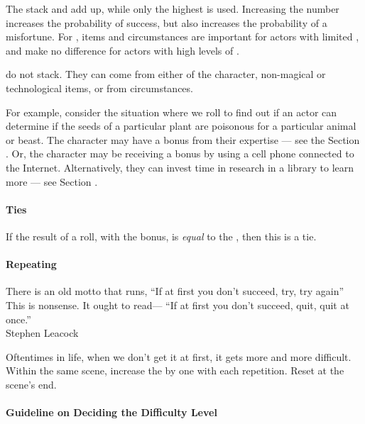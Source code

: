 \begin{emphasisParagraph}
	The  stack and add up, while only the highest  is used.
	Increasing the number  increases the probability of success, but
	also increases the probability of a misfortune. For ,
	items and circumstances are important for actors with limited ,
	and make no difference for actors with high levels of .
\end{emphasisParagraph}


 do not stack.
They can come from either  of the character,
non-magical or technological items, or from circumstances.

For example, consider the situation where we roll to find out if
an actor can determine if the seeds of a particular plant are
poisonous for a particular animal or beast. The character may have a
bonus from their expertise --- see the Section .
Or, the character may be receiving a bonus by using a cell phone connected to the Internet.
Alternatively, they can invest time in research in a library to learn more
--- see Section .




\paragraph*{Ties}
If the result of a roll, with the bonus, is \emph{equal} to the \acronymDL,
then this is a tie.

\paragraph*{Repeating}

\begin{emphasisParagraph}
There is an old motto that runs, ``If at first you don't succeed, try, try again'' This is nonsense. It ought to read— ``If at first you don't succeed, quit, quit at once.''\\
Stephen Leacock
\end{emphasisParagraph}

Oftentimes in life, when we don't get it at first, it gets more and more difficult.
Within the same scene, increase the \acronymDL by one with each repetition.
Reset at the scene's end.

\paragraph*{Guideline on Deciding the Difficulty Level}

